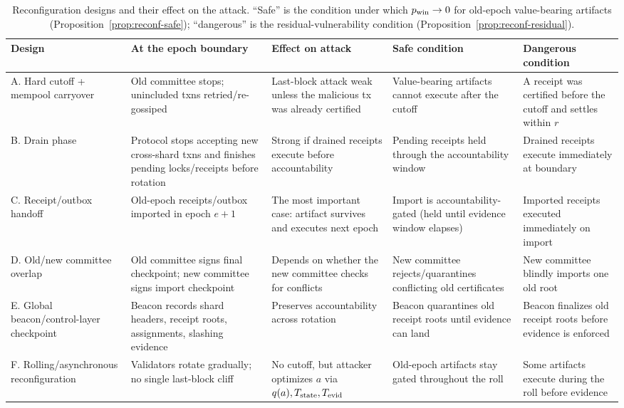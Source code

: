 \begin{table}[t]
\centering
\caption{Reconfiguration designs and their effect on the attack. ``Safe'' is the condition under
which $p_{\mathrm{win}}\to0$ for old-epoch value-bearing artifacts (Proposition~\ref{prop:reconf-safe});
``dangerous'' is the residual-vulnerability condition (Proposition~\ref{prop:reconf-residual}).}
\label{tab:taxonomy}
\small
\begin{tabularx}{\textwidth}{@{}l X X X X@{}}
\toprule
Design & At the epoch boundary & Effect on attack & Safe condition & Dangerous condition \\
\midrule
A. Hard cutoff + mempool carryover & Old committee stops; unincluded txns retried/re-gossiped & Last-block attack weak unless the malicious tx was already certified & Value-bearing artifacts cannot execute after the cutoff & A receipt was certified before the cutoff and settles within $r$ \\
B. Drain phase & Protocol stops accepting new cross-shard txns and finishes pending locks/receipts before rotation & Strong if drained receipts execute before accountability & Pending receipts held through the accountability window & Drained receipts execute immediately at boundary \\
C. Receipt/outbox handoff & Old-epoch receipts/outbox imported in epoch $e{+}1$ & The most important case: artifact survives and executes next epoch & Import is accountability-gated (held until evidence window elapses) & Imported receipts executed immediately on import \\
D. Old/new committee overlap & Old committee signs final checkpoint; new committee signs import checkpoint & Depends on whether the new committee checks for conflicts & New committee rejects/quarantines conflicting old certificates & New committee blindly imports one old root \\
E. Global beacon/control-layer checkpoint & Beacon records shard headers, receipt roots, assignments, slashing evidence & Preserves accountability across rotation & Beacon quarantines old receipt roots until evidence can land & Beacon finalizes old receipt roots before evidence is enforced \\
F. Rolling/asynchronous reconfiguration & Validators rotate gradually; no single last-block cliff & No cutoff, but attacker optimizes $a$ via $q(a),T_{\mathrm{state}},T_{\mathrm{evid}}$ & Old-epoch artifacts stay gated throughout the roll & Some artifacts execute during the roll before evidence \\
\bottomrule
\end{tabularx}
\end{table}

